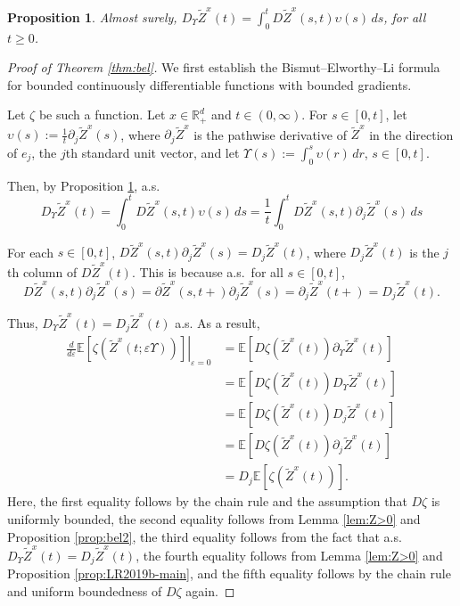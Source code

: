 \documentclass[11pt]{article}
\theoremstyle{definition}
\theoremstyle{plain}
\newtheorem{proposition}[assumption]{Proposition}
\begin{document}
\begin{proposition}\label{prop:bel3}
Almost surely, \( D_\Upsilon \tilde{Z}^x(t) = \int_0^t D{\tilde{Z}^x}(s,t) \upsilon(s)\,ds \), for all \( t \ge 0 \).
\end{proposition}

\begin{proof}[Proof of Theorem \ref{thm:bel}]
We first establish the Bismut–Elworthy–Li formula for bounded continuously differentiable functions with bounded gradients.

Let \( \zeta \) be such a function. Let \( x \in \mathbb{R}_+^d \) and \( t \in (0,\infty) \).  
For \( s \in [0,t] \), let \( \upsilon(s) := \frac{1}{t} \partial_j\tilde{Z}^x(s) \), 
where $\partial_j\tilde{Z}^x$ is the pathwise derivative of $\tilde Z^x$ in the direction of $e_j$, the $j$th standard unit vector, 
and let \( \Upsilon(s) := \int_0^s \upsilon(r)\,dr \), \( s \in [0,t] \).

Then, by Proposition \ref{prop:bel3}, a.s.
\[
D_\Upsilon \tilde{Z}^x(t) = \int_0^t D{\tilde{Z}^x}(s,t) \upsilon(s)\,ds = \frac{1}{t} \int_0^t D{\tilde{Z}^x}(s,t) \partial_j\tilde{Z}^x(s)\,ds
\]

For each \( s \in [0,t] \), \( D{\tilde{Z}^x}(s,t) \partial_j\tilde{Z}^x(s) = D_j \tilde{Z}^x(t) \), where $D_j \tilde{Z}^x(t)$ is the $j$th column 
of $D{\tilde{Z}^x}(t)$.
This is because a.s.\ for all \( s \in [0,t] \),
\[
D{\tilde{Z}^x}(s,t) \partial_j \tilde{Z}^x(s) = \partial \tilde{Z}^x(s,t+) \partial_j \tilde{Z}^x(s) = \partial_j \tilde{Z}^x(t+) = D_j \tilde{Z}^x(t).
\]

Thus, $D_\Upsilon \tilde{Z}^x(t) = D_j \tilde{Z}^x(t)$ a.s. As a result, 
\begin{align*}
\left. \frac{d}{d\varepsilon} \mathbb{E} \left[ \zeta\left( \tilde{Z}^x(t; \varepsilon \Upsilon) \right) \right] \right|_{\varepsilon = 0}
& = \mathbb{E} \left[ D\zeta\left( \tilde{Z}^x(t) \right) \partial_\Upsilon \tilde{Z}^x(t) \right] \\
& = \mathbb{E} \left[ D\zeta\left( \tilde{Z}^x(t) \right) D_\Upsilon \tilde{Z}^x(t) \right] \\
& = \mathbb{E} \left[ D\zeta\left( \tilde{Z}^x(t) \right) D_j\tilde{Z}^x(t) \right] \\
& = \mathbb{E} \left[ D\zeta\left( \tilde{Z}^x(t) \right) \partial_j\tilde{Z}^x(t) \right] \\
& = D_j \mathbb{E} \left[ \zeta( \tilde{Z}^x(t) ) \right].
\end{align*}
Here, the first equality follows by the chain rule and the assumption that $D\zeta$ is uniformly bounded, 
the second equality follows from Lemma \ref{lem:Z>0} and Proposition \ref{prop:bel2}, 
the third equality follows from the fact that a.s. $D_\Upsilon \tilde{Z}^x(t) = D_j \tilde{Z}^x(t)$, the fourth equality follows from 
Lemma \ref{lem:Z>0} and Proposition \ref{prop:LR2019b-main}, 
and the fifth equality follows by the chain rule and uniform boundedness of $D\zeta$ again. 


\end{proof}
\end{document}
